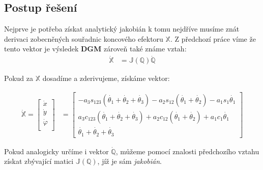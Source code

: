 \documentclass{article}
\begin{document}
		\subsection{Postup řešení}
			Nejprve je potřeba získat analytický jakobián k tomu nejdříve musíme znát derivaci zobecněných souřadnic koncového efektoru  $ \mathbb{X} $.
			Z předchozí práce víme že tento vektor je výsledek \textbf{DGM} zároveň také známe vztah:
				\begin{align}
					\dot{\mathbb{X}} &= \mathbb{J}(\mathbb{Q})\dot{\mathbb{Q}} \label{eq:poku:rychlost}
				\end{align}
			
			\noindent Pokud za \(\mathbb{X}\) dosadíme a zderivujeme, získáme vektor:
			
				\begin{align}
					\dot{\mathbb{X}} = \begin{bmatrix}
						\dot{x} \\
						\dot{y} \\
						\dot{\varphi} \\
					\end{bmatrix} &= \begin{bmatrix}
						-a_3s_{123}(\dot{\theta_1}+\dot{\theta_2}+\dot{\theta_3})-a_2s_{12}(\dot{\theta_1}+\dot{\theta_2}) - a_1s_1\dot{\theta_1} \\
						a_3c_{123}(\dot{\theta_1}+\dot{\theta_2}+\dot{\theta_3})+a_2c_{12}(\dot{\theta_1}+\dot{\theta_2}) + a_1c_1\dot{\theta_1} \\
						\dot{\theta_1}+\dot{\theta_2}+\dot{\theta_3}
					\end{bmatrix}
				\end{align}
			
			\noindent Pokud analogicky určíme i vektor \(\dot{\mathbb{Q}}\), můžeme pomocí znalosti předchozího vztahu
			získat zbývající matici \(\mathbb{J}(\mathbb{Q})\), jíž je sám \emph{jakobián}.
		
\end{document}
